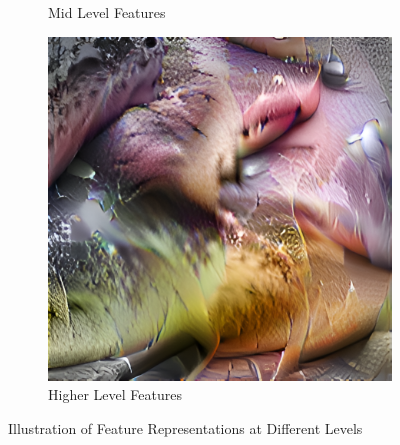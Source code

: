 \begin{figure}[htbp]
\begin{subfigure}[b]{0.25\textwidth}
        \caption{Mid Level Features}
    \end{subfigure}
    \hspace{0.05\textwidth} %
    \begin{subfigure}[b]{0.25\textwidth} %
        \centering
        \includegraphics[width=\textwidth]{figures/featurelayersviz/late_channel.png}
        \caption{Higher Level Features}
    \end{subfigure}
    \caption{Illustration of Feature Representations at Different Levels}
    \label{fig:featurelayers}
\end{figure}